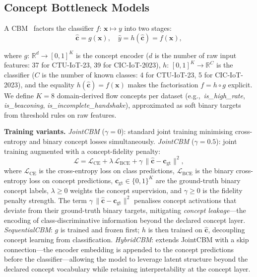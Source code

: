\documentclass[conference]{IEEEtran}
\begin{document}
\subsection{Concept Bottleneck Models}
\label{sec:cbm}

A CBM~\cite{koh2020concept} factors the classifier
$f{:}\,\mathbf{x}{\mapsto}y$ into two stages:
\begin{equation}
  \hat{\mathbf{c}} = g(\mathbf{x}),
  \quad\hat{y} = h(\hat{\mathbf{c}}) = f(\mathbf{x}),
  \label{eq:cbm}
\end{equation}
\begin{sloppypar}
where $g{:}\,\mathbb{R}^d{\to}[0,1]^K$ is the concept encoder ($d$ is
the number of raw input features: 37 for CTU-IoT-23, 39 for
CIC-IoT-2023), $h{:}\,[0,1]^K{\to}\mathbb{R}^C$ is the classifier
($C$ is the number of known classes: 4 for CTU-IoT-23, 5 for
CIC-IoT-2023), and the equality $h(\hat{\mathbf{c}})=f(\mathbf{x})$
makes the factorisation $f=h\circ g$ explicit.
We define $K{=}8$ domain-derived flow concepts per dataset
(e.g.,\ \textit{is\_high\_rate}, \textit{is\_beaconing},
\textit{is\_incomplete\_handshake}), approximated as soft binary
targets from threshold rules on raw features.
\end{sloppypar}

\textbf{Training variants.}
\emph{JointCBM} ($\gamma{=}0$): standard joint training minimising
cross-entropy and binary concept losses simultaneously.
\emph{JointCBM} ($\gamma{=}0.5$): joint training augmented with a
concept-fidelity penalty:
\begin{equation}
  \mathcal{L} = \mathcal{L}_{\mathrm{CE}} + \lambda\,\mathcal{L}_{\mathrm{BCE}}
    + \gamma\,\|\hat{\mathbf{c}} - \mathbf{c}_{\text{gt}}\|^2,
  \label{eq:cbm_loss}
\end{equation}
where $\mathcal{L}_{\mathrm{CE}}$ is the cross-entropy loss on class
predictions, $\mathcal{L}_{\mathrm{BCE}}$ is the binary cross-entropy
loss on concept predictions, $\mathbf{c}_{\text{gt}}\in\{0,1\}^K$ are
the ground-truth binary concept labels, $\lambda{\geq}0$ weights the
concept supervision, and $\gamma{\geq}0$ is the fidelity penalty
strength. The term $\gamma\,\|\hat{\mathbf{c}} - \mathbf{c}_{\text{gt}}\|^2$
penalises concept activations that deviate from their ground-truth
binary targets, mitigating \emph{concept leakage}---the encoding of
class-discriminative information beyond the declared concept layer.
\emph{SequentialCBM}: $g$ is trained and frozen first; $h$ is then
trained on $\hat{\mathbf{c}}$, decoupling concept learning from
classification.
\emph{HybridCBM}: extends JointCBM with a skip connection---the
encoder embedding is appended to the concept predictions before the
classifier---allowing the model to leverage latent structure beyond the
declared concept vocabulary while retaining interpretability at the
concept layer.
\end{document}
